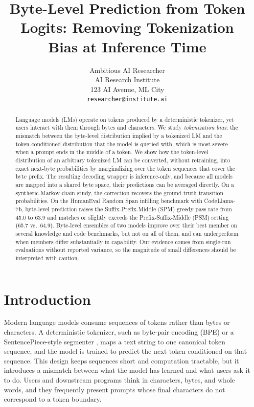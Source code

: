 \documentclass{article} %
\title{Byte-Level Prediction from Token Logits: Removing Tokenization Bias at Inference Time}
\author{Ambitious AI Researcher\\
AI Research Institute\\
123 AI Avenue, ML City\\
\texttt{researcher@institute.ai}
}
\begin{document}
\maketitle

\begin{abstract}
Language models (LMs) operate on tokens produced by a deterministic tokenizer, yet users interact with them through bytes and characters. We study \emph{tokenization bias}: the mismatch between the byte-level distribution implied by a tokenized LM and the token-conditioned distribution that the model is queried with, which is most severe when a prompt ends in the middle of a token. We show how the token-level distribution of an arbitrary tokenized LM can be converted, without retraining, into exact next-byte probabilities by marginalizing over the token sequences that cover the byte prefix. The resulting decoding wrapper is inference-only, and because all models are mapped into a shared byte space, their predictions can be averaged directly. On a synthetic Markov-chain study, the correction recovers the ground-truth transition probabilities. On the HumanEval Random Span infilling benchmark with CodeLlama-7b, byte-level prediction raises the Suffix-Prefix-Middle (SPM) greedy pass rate from 45.0 to 63.9 and matches or slightly exceeds the Prefix-Suffix-Middle (PSM) setting (65.7 vs.\ 64.9). Byte-level ensembles of two models improve over their best member on several knowledge and code benchmarks, but not on all of them, and can underperform when members differ substantially in capability. Our evidence comes from single-run evaluations without reported variance, so the magnitude of small differences should be interpreted with caution.
\end{abstract}

\section{Introduction}
\label{sec:intro}
Modern language models consume sequences of tokens rather than bytes or characters. A deterministic tokenizer, such as byte-pair encoding (BPE) \citep{sennrich2016bpe} or a SentencePiece-style segmenter \citep{kudo2018sentencepiece}, maps a text string to one canonical token sequence, and the model is trained to predict the next token conditioned on that sequence. This design keeps sequences short and computation tractable, but it introduces a mismatch between what the model has learned and what users ask it to do. Users and downstream programs think in characters, bytes, and whole words, and they frequently present prompts whose final characters do not correspond to a token boundary.
\end{document}
